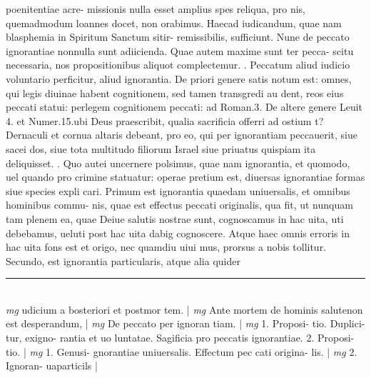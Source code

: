 \documentclass{article}
\begin{document}
\begin{pages}
poenitentiae acre- missionis nulla esset amplius spes reliqua, pro nis, quemadmodum loannes docet, non orabimus. Haecad iudicandum, quae nam blasphemia in Spiritum Sanctum sitir- remissibilis, sufficiunt.  \pend\pstart Nune de peccato ignorantiae nonnulla sunt adiicienda. Quae autem maxime sunt ter pecca- scitu necessaria, nos propositionibus aliquot complectemur.  \pend{}. Peccatum aliud iudicio voluntario perficitur, aliud ignorantia. De priori genere satis notum est: omnes, qui legis diuinae habent cognitionem, sed tamen transgredi au dent, reos eius peccati statui: perlegem cognitionem peccati: ad Roman.3. De altere genere Leuit 4. et Numer.15.ubi Deus praescribit, qualia sacrificia offerri ad ostium t? Dernaculi et cornua altaris debeant, pro eo, qui per ignorantiam peccauerit, siue sacei dos, siue tota multitudo filiorum Israel siue priuatus quispiam ita deliquisset.  \pend{}. Quo autei uncernere polsimus, quae nam ignorantia, et quomodo, uel quando pro crimine statuatur: operae pretium est, diuersas ignorantiae formas siue species expli cari. Primum est ignorantia quaedam uniuersalis, et omnibus hominibus commu- nis, quae est effectus peccati originalis, qua fit, ut nunquam tam plenem ea, quae Deiue salutis nostrae sunt, cognoscamus in hac uita, uti debebamus, ueluti post hac uita dabig cognoscere. Atque haec omnis erroris in hac uita fons est et origo, nec quamdiu uiui mus, prorsus a nobis tollitur. Secundo, est ignorantia particularis, atque  alia quider  \pend
\vspace{0.5cm}\noindent
\vspace{0.2cm}\rule{1cm}{0.2pt}\\ 
\hspace{0.2cm}\textit{mg}
\footnotesize udicium a bosteriori et postmor tem. 
\normalsize| 
\hspace{0.2cm}\textit{mg}
\footnotesize Ante mortem de hominis salutenon est desperandum, 
\normalsize| 
\hspace{0.2cm}\textit{mg}
\footnotesize De peccato per ignoran tiam. 
\normalsize| 
\hspace{0.2cm}\textit{mg}
\footnotesize 1. Proposi- tio. Duplici- tur, exigno- rantia et uo luntatae. Sagificia pro peccatis ignorantiae. 2. Proposi- tio. 
\normalsize| 
\hspace{0.2cm}\textit{mg}
\footnotesize 1. Genusi- gnorantiae uniuersalis. Effectum pec cati origina- lis. 
\normalsize| 
\hspace{0.2cm}\textit{mg}
\footnotesize 2. Ignoran- uaparticils 
\normalsize| 

\end{pages}
\end{document}
